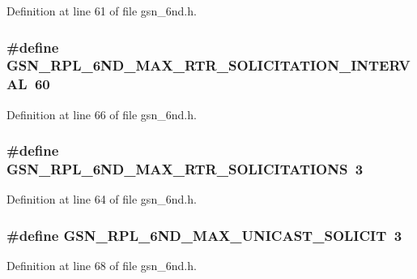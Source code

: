 Definition at line 61 of file gsn\_\-6nd.h.

\hypertarget{a00473_a7560b679f6eb8829592f407a2c0ba612}{
\subsubsection[{GSN\_\-RPL\_\-6ND\_\-MAX\_\-RTR\_\-SOLICITATION\_\-INTERVAL}]{\setlength{\rightskip}{0pt plus 5cm}\#define GSN\_\-RPL\_\-6ND\_\-MAX\_\-RTR\_\-SOLICITATION\_\-INTERVAL~60}}
\label{a00473_a7560b679f6eb8829592f407a2c0ba612}


Definition at line 66 of file gsn\_\-6nd.h.

\hypertarget{a00473_a20f756f4d9b91af664bcf8a40cd2dfde}{
\subsubsection[{GSN\_\-RPL\_\-6ND\_\-MAX\_\-RTR\_\-SOLICITATIONS}]{\setlength{\rightskip}{0pt plus 5cm}\#define GSN\_\-RPL\_\-6ND\_\-MAX\_\-RTR\_\-SOLICITATIONS~3}}
\label{a00473_a20f756f4d9b91af664bcf8a40cd2dfde}


Definition at line 64 of file gsn\_\-6nd.h.

\hypertarget{a00473_a7e40d4d5b5e886c51ae68eb1f2f00203}{
\subsubsection[{GSN\_\-RPL\_\-6ND\_\-MAX\_\-UNICAST\_\-SOLICIT}]{\setlength{\rightskip}{0pt plus 5cm}\#define GSN\_\-RPL\_\-6ND\_\-MAX\_\-UNICAST\_\-SOLICIT~3}}
\label{a00473_a7e40d4d5b5e886c51ae68eb1f2f00203}


Definition at line 68 of file gsn\_\-6nd.h.

